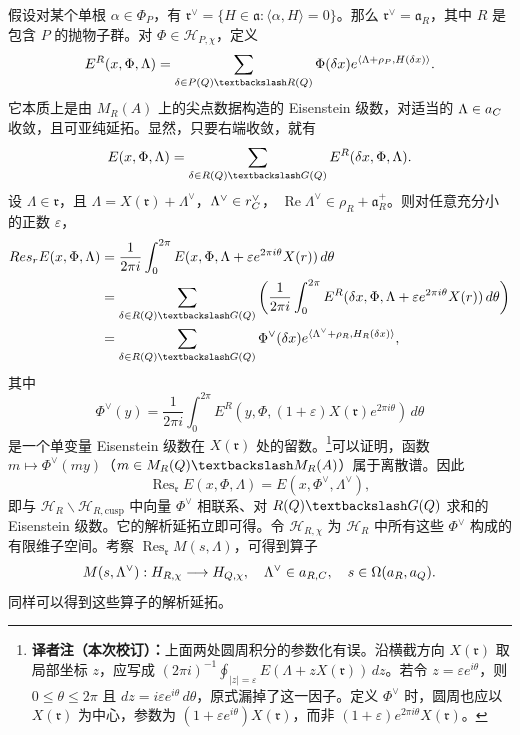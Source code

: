 假设对某个单根 $\alpha\in\Phi_P$，有
$\mathfrak r^\vee=\{H\in\mathfrak a:\langle\alpha,H\rangle=0\}$。那么 $\mathfrak r^\vee=\mathfrak a_R$，其中 $R$ 是包含 $P$ 的抛物子群。对 $\Phi\in\mathcal H_{P,\chi}$，定义
\[
 E^R(x,\Phi,\Lambda)=\sum_{\delta\in P(\Q)\backslash R(\Q)}
 \Phi(\delta x)e^{\langle\Lambda+\rho_P,H(\delta x)\rangle}.
\]
它本质上是由 $M_R(A)$ 上的尖点数据构造的 Eisenstein 级数，对适当的 $\Lambda\in a_C$ 收敛，且可亚纯延拓。显然，只要右端收敛，就有
\[
 E(x,\Phi,\Lambda)=\sum_{\delta\in R(\Q)\backslash G(\Q)}E^R(\delta x,\Phi,\Lambda).
\]
设 $\Lambda\in\mathfrak r$，且
$\Lambda=X(\mathfrak r)+\Lambda^\vee$，$\Lambda^\vee\in r_C^\vee$，
$\operatorname{Re}\Lambda^\vee\in\rho_R+\mathfrak a_R^+$。则对任意充分小的正数 $\varepsilon$，
\[
\begin{aligned}
 \operatorname{Res}_\mathfrak rE(x,\Phi,\Lambda)
 &=\frac1{2\pi i}\int_0^{2\pi}
 E(x,\Phi,\Lambda+\varepsilon e^{2\pi i\theta}X(\mathfrak r))\,d\theta\\
 &=\sum_{\delta\in R(\Q)\backslash G(\Q)}
 \left(\frac1{2\pi i}\int_0^{2\pi}
 E^R(\delta x,\Phi,\Lambda+\varepsilon e^{2\pi i\theta}X(\mathfrak r))\,d\theta\right)\\
 &=\sum_{\delta\in R(\Q)\backslash G(\Q)}
 \Phi^\vee(\delta x)e^{\langle\Lambda^\vee+\rho_R,H_R(\delta x)\rangle},
\end{aligned}
\]
其中
\[
 \Phi^\vee(y)=\frac1{2\pi i}\int_0^{2\pi}
 E^R(y,\Phi,(1+\varepsilon)X(\mathfrak r)e^{2\pi i\theta})\,d\theta
\]
是一个单变量 Eisenstein 级数在 $X(\mathfrak r)$ 处的留数。\footnote{\textbf{译者注（本次校订）：}上面两处圆周积分的参数化有误。沿横截方向 $X(\mathfrak r)$ 取局部坐标 $z$，应写成 $(2\pi i)^{-1}\oint_{|z|=\varepsilon}E(\Lambda+zX(\mathfrak r))\,dz$。若令 $z=\varepsilon e^{i\theta}$，则 $0\leq\theta\leq2\pi$ 且 $dz=i\varepsilon e^{i\theta}\,d\theta$，原式漏掉了这一因子。定义 $\Phi^\vee$ 时，圆周也应以 $X(\mathfrak r)$ 为中心，参数为 $(1+\varepsilon e^{i\theta})X(\mathfrak r)$，而非 $(1+\varepsilon)e^{2\pi i\theta}X(\mathfrak r)$。}可以证明，函数
$m\mapsto\Phi^\vee(my)$（$m\in M_R(\Q)\backslash M_R(A)$）属于离散谱。因此
\[
 \operatorname{Res}_\mathfrak rE(x,\Phi,\Lambda)=E(x,\Phi^\vee,\Lambda^\vee),
\]
即与 $\mathcal H_R\backslash\mathcal H_{R,\mathrm{cusp}}$ 中向量 $\Phi^\vee$ 相联系、对 $R(\Q)\backslash G(\Q)$ 求和的 Eisenstein 级数。它的解析延拓立即可得。令 $\mathcal H_{R,\chi}$ 为 $\mathcal H_R$ 中所有这些 $\Phi^\vee$ 构成的有限维子空间。考察 $\operatorname{Res}_\mathfrak rM(s,\Lambda)$，可得到算子
\[
 M(s,\Lambda^\vee):H_{R,\chi}\longrightarrow H_{Q,\chi},
 \quad\Lambda^\vee\in a_{R,C},\quad s\in\Omega(a_R,a_Q).
\]
同样可以得到这些算子的解析延拓。

